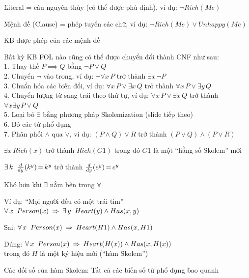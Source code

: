 \documentclass[fleqn]{article}
\begin{document}
\begin{huge}

\u{Literal} = câu nguyên thủy (có thể được phủ định), ví dụ: $\lnot Rich(Me)$

\u{Mệnh đề (Clause)} = phép tuyển các chữ, ví dụ: $\lnot Rich(Me) \lor Unhappy(Me)$

KB được phép của các mệnh đề

Bất kỳ KB FOL nào cũng có thể được chuyển đổi thành CNF như sau:\\
1. Thay thế $P{\implies}Q$ bằng ${\lnot}P{\lor}Q$\\
2. Chuyển $\lnot$ vào trong, ví dụ: 
      $\lnot \forall x\,P$ trở thành $\exists x\,\lnot P$\\
3. Chuẩn hóa các biến đổi, ví dụ: 
  $\forall x\,P \lor \exists x\,Q$ trở thành $\forall x\,P \lor \exists y\,Q$\\
4. Chuyển lượng từ sang trái theo thứ tự, ví dụ:
  $\forall x\,P \lor \exists x\,Q$ trở thành $\forall x\exists y\,P \lor Q$\\
5. Loại bỏ $\exists$ bằng phương pháp Skolemization (slide tiếp theo)\\
6. Bỏ các từ phổ dụng\\
7. Phân phối $\land$ qua $\lor$, ví dụ:
    $(P \land Q) \lor R$ trở thành $(P\lor Q) \land (P\lor R)$




$\exists x\,Rich(x)$ trở thành $Rich(G1)$ trong đó $G1$ là một ``\u{hằng số Skolem}'' mới

$\exists\,k\;\; \frac{d}{dy}(k^y) {\,{=}\,} k^y$ trở thành $\frac{d}{dy}(e^y) {\,{=}\,} e^y$

Khó hơn khi $\exists$ nằm bên trong $\forall$

Ví dụ: ``Mọi người đều có một trái tim''\al
   $\forall\,x\;\; Person(x) \:\;{\Rightarrow}\:\; \exists\,y\;\; Heart(y) \land Has(x,y)$

\u{Sai}:\al
   $\forall\,x\;\; Person(x) \:\;{\Rightarrow}\:\; Heart(H1) \land Has(x,H1)$

\u{ Đúng}:\al
   $\forall\,x\;\; Person(x) \:\;{\Rightarrow}\:\; Heart(H(x)) \land Has(x,H(x))$\\
trong đó $H$ là một ký hiệu mới (``hàm Skolem'')

Các đối số của hàm Skolem: Tất cả các biến số từ phổ dụng \u{bao quanh}




\end{huge}
\end{document}
